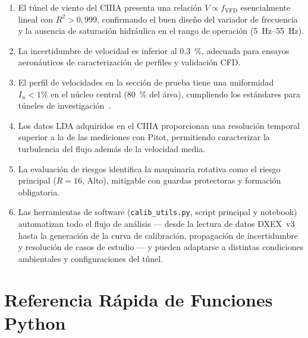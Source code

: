 \documentclass[12pt,a4paper]{article}
\begin{document}
\begin{enumerate}
	\item El túnel de viento del CIIIA presenta una relación
	      $V \propto f_\mathrm{VFD}$ esencialmente lineal con $R^2 > 0{,}999$,
	      confirmando el buen diseño del variador de frecuencia y la ausencia
	      de saturación hidráulica en el rango de operación (\SIrange{5}{55}{\Hz}).
	\item La incertidumbre de velocidad es inferior al \SI{0.3}{\percent},
	      adecuada para ensayos aeronáuticos de caracterización de perfiles
	      y validación CFD.
	\item El perfil de velocidades en la sección de prueba tiene una uniformidad
	      $I_u < 1\%$ en el núcleo central (\SI{80}{\percent} del área),
	      cumpliendo los estándares para túneles de investigación~\cite{barlow1999}.
	\item Los datos LDA adquiridos en el CIIIA proporcionan una resolución
	      temporal superior a la de las mediciones con Pitot, permitiendo
	      caracterizar la turbulencia del flujo además de la velocidad media.
	\item La evaluación de riesgos identifica la maquinaria rotativa como el
	      riesgo principal ($R = 16$, Alto), mitigable con guardas protectoras
	      y formación obligatoria.
	\item Las herramientas de software (\texttt{calib\_utils.py}, script
	      principal y notebook) automatizan todo el flujo de análisis
	      --- desde la lectura de datos DXEX~v3 hasta la generación de la curva
	      de calibración, propagación de incertidumbre y resolución de casos
	      de estudio --- y pueden adaptarse a distintas condiciones ambientales
	      y configuraciones del túnel.
\end{enumerate}

\printbibliography[title={Referencias}]

\appendix
\section{Referencia Rápida de Funciones Python}
\label{sec:appendix_python}
\end{document}
